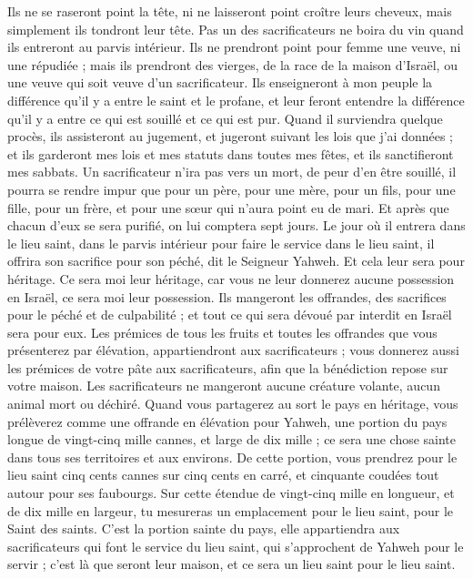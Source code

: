 \begin{multicols}{2}
Ils ne se raseront point la tête, ni ne laisseront point croître leurs cheveux, mais simplement ils tondront leur tête\FTNT{}.
Pas un des sacrificateurs ne boira du vin quand ils entreront au parvis intérieur.
Ils ne prendront point pour femme une veuve, ni une répudiée ; mais ils prendront des vierges, de la race de la maison d'Israël, ou une veuve qui soit veuve d'un sacrificateur\FTNT{}.
Ils enseigneront à mon peuple la différence qu'il y a entre le saint et le profane, et leur feront entendre la différence qu'il y a entre ce qui est souillé et ce qui est pur.
Quand il surviendra quelque procès, ils assisteront au jugement, et jugeront suivant les lois que j'ai données ; et ils garderont mes lois et mes statuts dans toutes mes fêtes, et ils sanctifieront mes sabbats.
Un sacrificateur n’ira pas vers un mort, de peur d'en être souillé, il pourra se rendre impur que pour un père, pour une mère, pour un fils, pour une fille, pour un frère, et pour une sœur qui n'aura point eu de mari\FTNT{}.
Et après que chacun d'eux se sera purifié, on lui comptera sept jours.
Le jour où il entrera dans le lieu saint, dans le parvis intérieur pour faire le service dans le lieu saint, il offrira son sacrifice pour son péché, dit le Seigneur Yahweh.
Et cela leur sera pour héritage. Ce sera moi leur héritage, car vous ne leur donnerez aucune possession en Israël, ce sera moi leur possession\FTNT{}.
Ils mangeront les offrandes, des sacrifices pour le péché et de culpabilité ; et tout ce qui sera dévoué par interdit en Israël sera pour eux.
Les prémices de tous les fruits et toutes les offrandes que vous présenterez par élévation, appartiendront aux sacrificateurs ; vous donnerez aussi les prémices de votre pâte aux sacrificateurs, afin que la bénédiction repose sur votre maison.
Les sacrificateurs ne mangeront aucune créature volante, aucun animal mort ou déchiré\FTNT{}.
\VerseOne{}Quand vous partagerez au sort le pays en héritage, vous prélèverez comme une offrande en élévation pour Yahweh, une portion du pays longue de vingt-cinq mille cannes, et large de dix mille ; ce sera une chose sainte dans tous ses territoires et aux environs.
De cette portion, vous prendrez pour le lieu saint cinq cents cannes sur cinq cents en carré, et cinquante coudées tout autour pour ses faubourgs.
Sur cette étendue de vingt-cinq mille en longueur, et de dix mille en largeur, tu mesureras un emplacement pour le lieu saint, pour le Saint des saints.
C’est la portion sainte du pays, elle appartiendra aux sacrificateurs qui font le service du lieu saint, qui s’approchent de Yahweh pour le servir ; c’est là que seront leur maison, et ce sera un lieu saint pour le lieu saint.

\end{multicols}
